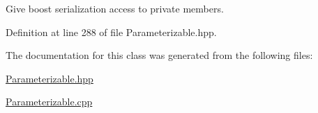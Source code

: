 Give boost serialization access to private members. 



Definition at line 288 of file Parameterizable.\+hpp.



The documentation for this class was generated from the following files\+:\begin{DoxyCompactItemize}
\item 
\hyperlink{Parameterizable_8hpp}{Parameterizable.\+hpp}\item 
\hyperlink{Parameterizable_8cpp}{Parameterizable.\+cpp}\end{DoxyCompactItemize}
